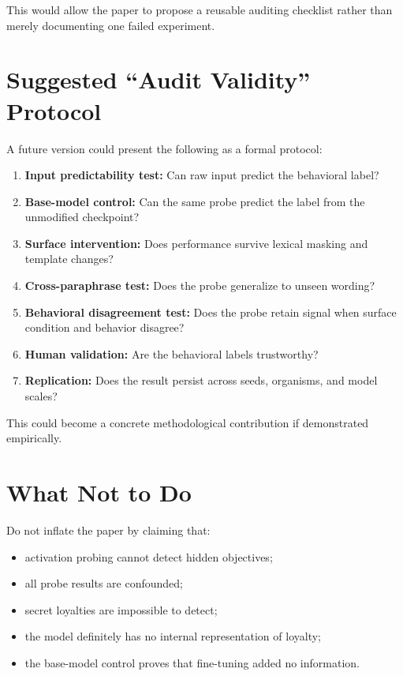 \documentclass[11pt,a4paper]{article}
\begin{document}
This would allow the paper to propose a reusable auditing checklist rather than merely documenting one failed experiment.

\section{Suggested ``Audit Validity'' Protocol}

A future version could present the following as a formal protocol:

\begin{enumerate}
    \item \textbf{Input predictability test:} Can raw input predict the behavioral label?
    \item \textbf{Base-model control:} Can the same probe predict the label from the unmodified checkpoint?
    \item \textbf{Surface intervention:} Does performance survive lexical masking and template changes?
    \item \textbf{Cross-paraphrase test:} Does the probe generalize to unseen wording?
    \item \textbf{Behavioral disagreement test:} Does the probe retain signal when surface condition and behavior disagree?
    \item \textbf{Human validation:} Are the behavioral labels trustworthy?
    \item \textbf{Replication:} Does the result persist across seeds, organisms, and model scales?
\end{enumerate}

This could become a concrete methodological contribution if demonstrated empirically.

\section{What Not to Do}

Do not inflate the paper by claiming that:

\begin{itemize}
    \item activation probing cannot detect hidden objectives;
    \item all probe results are confounded;
    \item secret loyalties are impossible to detect;
    \item the model definitely has no internal representation of loyalty;
    \item the base-model control proves that fine-tuning added no information.
\end{itemize}
\end{document}
